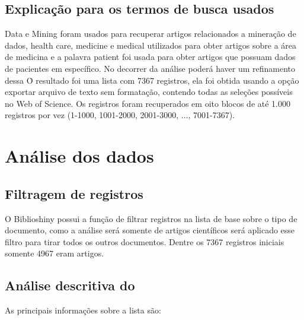 \subsection{Explicação para os termos de busca usados}
Data e Mining foram usados para recuperar artigos relacionados a mineração de dados, health care, medicine e medical utilizados para obter artigos sobre a área de medicina e a palavra patient foi usada para obter artigos que possuam dados de pacientes em específico. No decorrer da análise poderá haver um refinamento dessa \query\.

O resultado foi uma lista com 7367 registros, ela foi obtida usando a opção exportar arquivo de texto sem formatação, contendo todas as seleções possíveis no Web of Science. Os registros foram recuperados em oito blocos de até 1.000 registros por vez (1-1000, 1001-2000, 2001-3000, ..., 7001-7367).

\section{Análise dos dados}

\subsection{Filtragem de registros}

O Biblioshiny possui a função de filtrar registros na lista de base sobre o tipo de documento, como a análise será somente de artigos científicos será aplicado esse filtro para tirar todos os outros documentos. Dentre os 7367 registros iniciais somente 4967 eram artigos.

\subsection{Análise descritiva do \dataset\ }

As principais informações sobre a lista são:

